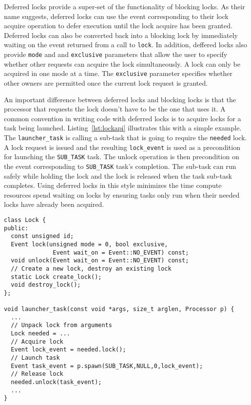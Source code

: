Deferred locks provide a super-set of the functionality of blocking locks.  As their
name suggests, deferred locks can use the event corresponding to their lock acquire
operation to defer execution until the lock acquire has been granted.  Deferred
locks can also be converted back into a blocking lock by immediately waiting on the event
returned from a call to {\tt lock}.  In addition, deffered locks also provide {\tt mode} and
and {\tt exclusive} parameters that allow the user to specify whether other requests can acquire
the lock simultaneously.  A lock can only be acquired in one mode at a time.  The
{\tt exclusive} parameter specifies whether other owners are permitted once the
current lock request is granted.

An important difference between deferred locks and blocking locks is that the processor
that requests the lock doesn't have to be the one that uses it.  A common
convention in writing code with deferred locks is to acquire locks for a task being
launched.  Listing~\ref{lst:lockapi} illustrates this with a simple example.  The
{\tt launcher\_task} is calling a sub-task that is going to require the {\tt needed}
lock.  A lock request is issued and the resulting {\tt lock\_event} is used as
a precondition for launching the {\tt SUB\_TASK} task.  The unlock operation is then
precondition on the event corresponding to {\tt SUB\_TASK} task's completion.  The
sub-task can run safely while holding the lock and the lock is released when the task
sub-task completes.  Using deferred locks in this style minimizes the time
compute resources spend waiting on locks by ensuring tasks only run when their needed
locks have already been acquired.

\begin{lstlisting}[float={t},label={lst:lockapi},caption={Deferred Lock Interface and Example.}]
class Lock {
public:
  const unsigned id;
  Event lock(unsigned mode = 0, bool exclusive, 
              Event wait_on = Event::NO_EVENT) const;
  void unlock(Event wait_on = Event::NO_EVENT) const;
  // Create a new lock, destroy an existing lock
  static Lock create_lock();
  void destroy_lock();
};

void launcher_task(const void *args, size_t arglen, Processor p) {
  ...
  // Unpack lock from arguments
  Lock needed = ...
  // Acquire lock
  Event lock_event = needed.lock();
  // Launch task
  Event task_event = p.spawn(SUB_TASK,NULL,0,lock_event);
  // Release lock
  needed.unlock(task_event);
  ...
}
\end{lstlisting}

